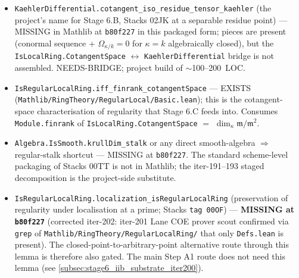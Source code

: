 \begin{itemize}
  \item \texttt{KaehlerDifferential.cotangent\_iso\_residue\_tensor\_kaehler}
    (the project's name for Stage 6.B, Stacks 02JK at a separable
    residue point) --- MISSING in Mathlib at \texttt{b80f227} in this
    packaged form; pieces are present (conormal sequence + \(\Omega_{\kappa
    / k} = 0\) for \(\kappa = k\) algebraically closed), but the
    \texttt{IsLocalRing.CotangentSpace} \(\leftrightarrow\)
    \texttt{KaehlerDifferential} bridge is not assembled. NEEDS-BRIDGE;
    project build of \(\sim\)100--200~LOC.
  \item \texttt{IsRegularLocalRing.iff\_finrank\_cotangentSpace} ---
    EXISTS (\texttt{Mathlib/RingTheory/RegularLocal/Basic.lean}); this
    is the cotangent-space characterisation of regularity that
    Stage 6.C feeds into. Consumes \texttt{Module.finrank} of
    \texttt{IsLocalRing.CotangentSpace} \(=\) \(\dim_\kappa \mathfrak m
    / \mathfrak m^2\).
  \item \texttt{Algebra.IsSmooth.krullDim\_stalk} or any direct
    smooth-algebra \(\Rightarrow\) regular-stalk shortcut --- MISSING
    at \texttt{b80f227}. The standard scheme-level packaging of Stacks
    00TT is not in Mathlib; the iter-191--193 staged decomposition is
    the project-side substitute.
  \item \texttt{IsRegularLocalRing.localization\_isRegularLocalRing}
    (preservation of regularity under localisation at a prime;
    Stacks \texttt{tag 00OF}) --- \textbf{MISSING at \texttt{b80f227}}
    (corrected iter-202: iter-201 Lane COE prover scout confirmed via
    \texttt{grep} of \texttt{Mathlib/RingTheory/RegularLocalRing/}
    that only \texttt{Defs.lean} is present). The
    closed-point-to-arbitrary-point alternative route through this
    lemma is therefore also gated. The main Step A1 route does not
    need this lemma (see
    \cref{subsec:stage6_iib_substrate_iter200}).
\end{itemize}

